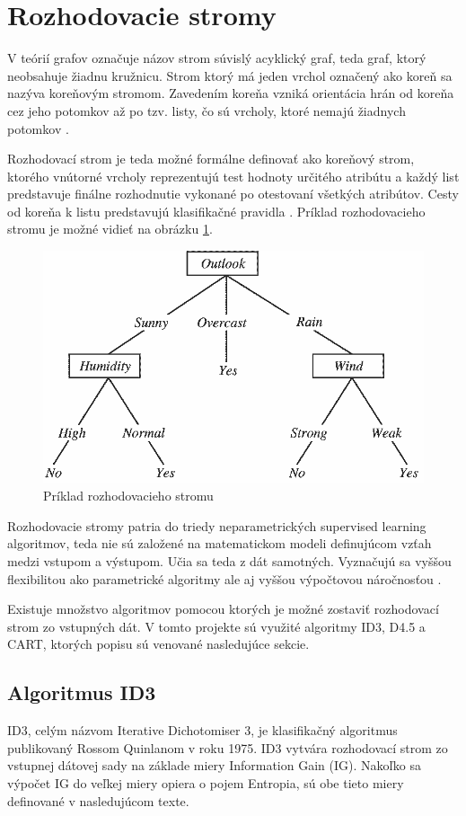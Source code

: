 \documentclass[slovak, master]{diploma}
\begin{document}
\section{Rozhodovacie stromy}
\label{sec:DecisionTreesOverview}
V teórií grafov označuje názov strom súvislý acyklický graf, teda graf, ktorý neobsahuje žiadnu kružnicu. Strom ktorý má jeden vrchol označený ako koreň sa nazýva koreňovým stromom. Zavedením koreňa vzniká orientácia hrán od koreňa cez jeho potomkov až po tzv. listy, čo sú vrcholy, ktoré nemajú žiadnych potomkov \cite{kovavr2012teorie}. 

Rozhodovací strom je teda možné formálne definovať ako koreňový strom, ktorého vnútorné vrcholy reprezentujú test hodnoty určitého atribútu a každý list predstavuje finálne rozhodnutie vykonané po otestovaní všetkých atribútov. Cesty od koreňa k listu predstavujú klasifikačné pravidla \cite{DecTreeTowards}. Príklad rozhodovacieho stromu je možné vidieť na obrázku \ref{pic:decTreeExample}.

\begin{figure}[!htbp]
    \centering
    \includegraphics[width=.7\textwidth]{Figures/strom.png}
    \caption{Príklad rozhodovacieho stromu \cite{DecTreeTowards}}
    \label{pic:decTreeExample}
\end{figure}

Rozhodovacie stromy patria do triedy neparametrických supervised learning algoritmov, teda nie sú založené na matematickom modeli definujúcom vzťah medzi vstupom a výstupom. Učia sa teda z dát samotných. Vyznačujú sa vyššou flexibilitou ako parametrické algoritmy ale aj vyššou výpočtovou náročnosťou \cite{paramVSnonparam}. 

Existuje množstvo algoritmov pomocou ktorých je možné zostaviť rozhodovací strom zo vstupných dát. V tomto projekte sú využité algoritmy ID3, D4.5 a CART, ktorých popisu sú venované nasledujúce sekcie. 

\subsection{Algoritmus ID3}
\label{sec:ID3}
ID3, celým názvom Iterative Dichotomiser 3, je klasifikačný algoritmus publikovaný Rossom Quinlanom v roku 1975. ID3 vytvára rozhodovací strom zo vstupnej dátovej sady na základe miery Information Gain (IG). Nakoľko sa výpočet IG do veľkej miery opiera o pojem Entropia, sú obe tieto miery definované v nasledujúcom texte. 
\end{document}
